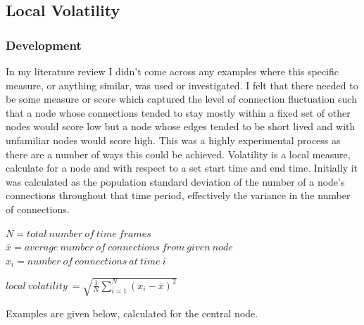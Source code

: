 
\subsection{Local Volatility}

\subsubsection*{Development}

In my literature review I didn’t come across any examples where this specific measure, or anything similar, was used or investigated. I felt that there needed to be some measure or score which captured the level of connection fluctuation such that a node whose connections tended to stay mostly within a fixed set of other nodes would score low but a node whose edges tended to be short lived and with unfamiliar nodes would score high. This was a highly experimental process as there are a number of ways this could be achieved.
Volatility is a local measure, calculate for a node and with respect to a set start time and end time. Initially it was calculated as the population standard deviation of the number of a node’s connections throughout that time period, effectively the variance in the number of connections.

\begin{center}
$N = total\ number\ of\ time\ frames$
$\overline{x} = average\ number\ of\ connections\ from\ given\ node $
$x_i = number\ of\ connections\ at\ time\ i$

$local\ volatility\ = \sqrt{\frac{1}{N} \sum_{i=1}^N (x_i - \overline{x})^2}$
\end{center}

Examples are given below, calculated for the central node.


